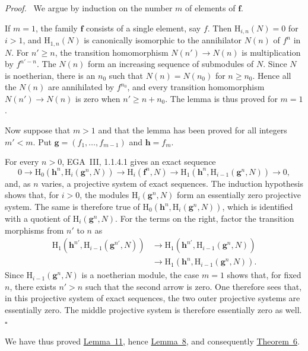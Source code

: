 \documentclass[11pt,a4paper,oneside]{book}
\providecommand{\srcpage}[1]{%
  \marginpar{\raggedright\scriptsize\color{gray}Original French p.~#1}}
\providecommand{\ffam}{\mathbf f}
\providecommand{\gfam}{\mathbf g}
\providecommand{\hfam}{\mathbf h}
\newenvironment{sgaproof}
  {\par\addvspace{0.4\baselineskip}\noindent\textit{Proof.}\ }
  {\hfill$\square$\par\addvspace{0.4\baselineskip}}
\theoremstyle{plain}
\theoremstyle{definition}
\theoremstyle{remark}
\begin{document}
\begin{sgaproof}
We argue by induction on the number $m$ of elements of $\ffam$.

If $m=1$, the family $\ffam$ consists of a single element, say $f$.
Then $\mathrm H_{i,n}(N)=0$ for $i>1$, and $\mathrm H_{1,n}(N)$ is
canonically isomorphic to the annihilator $N(n)$ of $f^n$ in $N$. For
$n'\geq n$, the transition homomorphism $N(n')\to N(n)$ is multiplication
by $f^{n'-n}$. The $N(n)$ form an increasing sequence of submodules of $N$.
Since $N$ is noetherian, there is an $n_0$ such that
$N(n)=N(n_0)$ for $n\geq n_0$. Hence all the $N(n)$ are annihilated by
$f^{n_0}$, and every transition homomorphism $N(n')\to N(n)$ is zero when
$n'\geq n+n_0$. The lemma is thus proved for $m=1$.

Now suppose that $m>1$ and that the lemma has been proved for all integers
$m'<m$. Put
$\gfam=(f_1,\ldots,f_{m-1})$ and $\hfam=f_m$.

For every $n>0$, EGA~III, 1.1.4.1 gives an exact sequence
\[
  0\longrightarrow
  \mathrm H_0(\hfam^n,\mathrm H_i(\gfam^n,N))
  \longrightarrow \mathrm H_i(\ffam^n,N)
  \longrightarrow
  \mathrm H_1(\hfam^n,\mathrm H_{i-1}(\gfam^n,N))
  \longrightarrow0,
\]
and, as $n$ varies, a projective system of exact sequences. The induction
hypothesis shows that, for $i>0$, the modules
$\mathrm H_i(\gfam^n,N)$ form an essentially zero projective system. The same
is therefore true of
$\mathrm H_0(\hfam^n,\mathrm H_i(\gfam^n,N))$, which is identified with a
quotient of $\mathrm H_i(\gfam^n,N)$. For the terms on the right, factor the
transition morphisms from $n'$ to $n$ as
\[
\begin{split}
  \mathrm H_1(\hfam^{n'},\mathrm H_{i-1}(\gfam^{n'},N))
  &\longrightarrow
  \mathrm H_1(\hfam^{n'},\mathrm H_{i-1}(\gfam^n,N)) \\
  &\longrightarrow
  \mathrm H_1(\hfam^n,\mathrm H_{i-1}(\gfam^n,N)).
\end{split}
\]
Since $\mathrm H_{i-1}(\gfam^n,N)$ is a noetherian module, the case $m=1$
shows that, for fixed $n$, there exists $n'>n$ such that the second arrow is
zero. One therefore sees\srcpage{26} that, in this projective system of exact
sequences, the two outer projective systems are essentially zero. The middle
projective system is therefore essentially zero as well.
\end{sgaproof}

We have thus proved \hyperref[II.11]{Lemma~11}, hence \hyperref[II.8]{Lemma~8}, and consequently \hyperref[II.6]{Theorem~6}.
\end{document}
